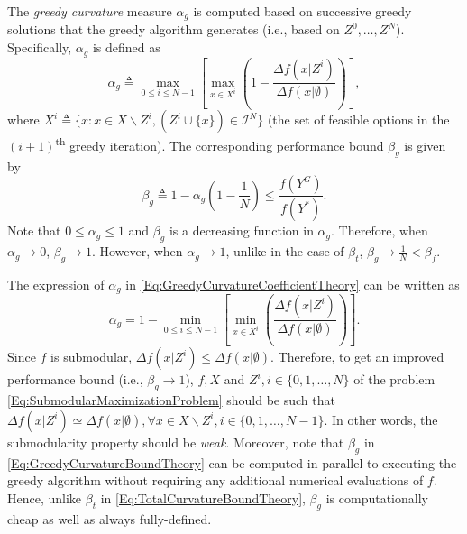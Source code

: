 \documentclass[conference]{IEEEtran}
\newcommand{\tsup}[1]{\textsuperscript{#1}}
\begin{document}
The \emph{greedy curvature} measure $\alpha_g$ is computed based on successive greedy solutions that the greedy algorithm generates (i.e., based on $Z^0,\ldots,Z^N$). Specifically, $\alpha_g$ is defined as   
\begin{equation}\label{Eq:GreedyCurvatureCoefficientTheory}
    \alpha_g \triangleq \max_{0 \leq i \leq N-1} \left[ \max_{x \in X^i}\left(1 - \frac{\Delta f(x\vert Z^i)}{\Delta f(x\vert \emptyset)}\right) \right],
\end{equation}
where $X^i \triangleq \{x: x \in X \backslash Z^i, (Z^i \cup \{x\}) \in \mathcal{I}^N\}$ (the set of feasible options in the $(i+1)$\tsup{th} greedy iteration). The corresponding performance bound $\beta_g$ is given by  
\begin{equation}\label{Eq:GreedyCurvatureBoundTheory}
    \beta_g \triangleq 1-\alpha_g\left(1-\frac{1}{N}\right) \leq \frac{f(Y^G)}{f(Y^*)}. 
\end{equation}
Note that $0 \leq \alpha_g \leq 1$ and $\beta_g$ is a decreasing function in $\alpha_g$. Therefore, when $\alpha_g \rightarrow 0$, $\beta_g \rightarrow 1$. However, when $\alpha_g \rightarrow 1$, unlike in the case of $\beta_t$,  $\beta_g \rightarrow \frac{1}{N} < \beta_f$. 


The expression of $\alpha_g$ in \eqref{Eq:GreedyCurvatureCoefficientTheory} can be written as
\begin{equation*}
    \alpha_g = 1 - \min_{0 \leq i \leq N-1} \left[ \min_{x \in X^i}\left(\frac{\Delta f(x\vert Z^i)}{\Delta f(x\vert \emptyset)}\right) \right].
\end{equation*}
Since $f$ is submodular, $\Delta f(x\vert Z^i) \leq \Delta f(x\vert \emptyset)$. Therefore, to get an improved performance bound (i.e., $\beta_g\rightarrow 1$), $f, X$ and $Z^i, i \in \{0,1,\ldots,N\}$ of the problem \eqref{Eq:SubmodularMaximizationProblem} should be such that $\Delta f(x\vert Z^i) \simeq \Delta f(x\vert \emptyset), \forall x \in X\backslash Z^i, i \in \{0,1,\ldots,N-1\}$. In other words, the submodularity property should be \emph{weak}. Moreover, note that $\beta_g$ in \eqref{Eq:GreedyCurvatureBoundTheory} can be computed in parallel to executing the greedy algorithm without requiring any additional numerical evaluations of $f$. Hence, unlike $\beta_t$ in \eqref{Eq:TotalCurvatureBoundTheory}, $\beta_g$ is computationally cheap as well as always fully-defined. 


\end{document}
